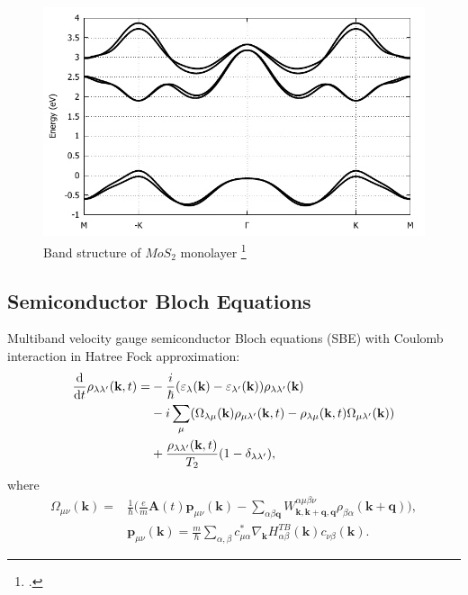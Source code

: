 \documentclass{beamer}
\begin{document}
	\begin{frame}
		\begin{figure}
			\caption{Band structure of $MoS_2$ monolayer
				\footcitetext{liu_three-band_2013}}
			\includegraphics[width=0.75\linewidth]{images/BS.pdf}
		\end{figure}
	\end{frame}
	\subsection{Semiconductor Bloch Equations}
	\begin{frame}
	Multiband velocity gauge semiconductor Bloch equations (SBE) with Coulomb interaction in Hatree Fock approximation:
	\begin{align}
		\dv{ }{t}\rho_{\lambda \lambda'} (\textbf{k},t) = &-\frac{i}{\hbar} (\varepsilon_{\lambda}(\textbf{k}) -\varepsilon_{\lambda'}(\textbf{k}))\rho_{\lambda \lambda'} (\textbf{k})\nonumber\\
		& -i \sum_{\mu} (\Omega_{\lambda \mu}(\textbf{k})\rho_{\mu \lambda'}(\textbf{k},t) -\rho_{\lambda \mu}(\textbf{k},t)\Omega_{\mu \lambda'}(\textbf{k}))\\
		& + \frac{\rho_{\lambda \lambda'}(\textbf{k},t)}{T_2}(1-\delta_{\lambda\lambda'}),\nonumber
	\end{align}
	where
	\begin{align}
		\Omega_{\mu \nu}(\textbf{k}) = &\frac{1}{\hbar} \bigg(\frac{e}{m}\textbf{A}(t)\textbf{p}_{\mu \nu}(\textbf{k}) - \sum_{\alpha \beta \textbf{q}} W^{\alpha \mu \beta\nu}_{\textbf{k},\textbf{k}+\textbf{q},\textbf{q}}\rho_{\beta\alpha}(\textbf{k}+\textbf{q})\bigg),\\
		&\textbf{p}_{\mu\nu}(\textbf{k}) = \frac{m}{\hbar}\sum_{\alpha,\beta} c^*_{\mu\alpha}\nabla_{\textbf{k}}H^{TB}_{\alpha\beta}(\textbf{k})c_{\nu\beta}(\textbf{k}).
	\end{align}
	\end{frame}
\end{document}

